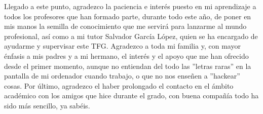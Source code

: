        \vspace{1cm}

Llegado a este punto, agradezco la paciencia e interés puesto en mi aprendizaje a todos los profesores que han formado parte, durante todo este año, de poner en mis manos la semilla de conocimiento que me servirá para lanzarme al mundo profesional, así como a mi tutor Salvador García López, quien se ha encargado de ayudarme y supervisar este TFG.
Agradezco a toda mi familia y, con mayor énfasis a mis padres y a mi hermano, el interés y el apoyo que me han ofrecido desde el primer momento, aunque no entiendan del todo las ''letras raras'' en la pantalla de mi ordenador cuando trabajo, o que no nos enseñen a ''hackear'' cosas. Por último, agradezco el haber prolongado el contacto en el ámbito académico con los amigos que hice durante el grado, con buena compañía todo ha sido más sencillo, ya sabéis.
